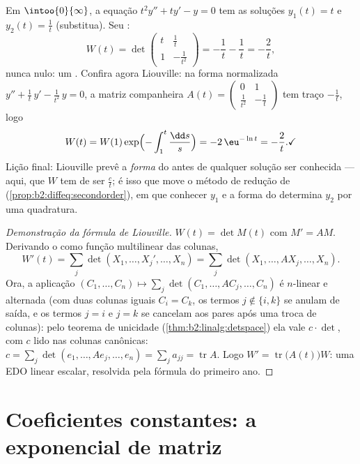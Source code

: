 \begin{example}\label{ex:b2:diffeq:eulerwronskian}
Em $\intoo{0}{\infty}$, a equação $t^2y'' + ty' - y = 0$ tem
as soluções $y_1(t) = t$ e $y_2(t) = \frac1t$ (substitua).
Seu :
\[
W(t) = \det\begin{pmatrix} t & \tfrac1t\\[2pt]
1 & -\tfrac{1}{t^2}\end{pmatrix}
= -\frac1t - \frac1t = -\frac2t ,
\]
nunca nulo: um . Confira agora Liouville: na
forma normalizada $y'' + \frac1t\,y' - \frac{1}{t^2}\,y = 0$, a
matriz companheira $A(t) = \begin{pmatrix} 0 & 1\\ \frac{1}{t^2}
& -\frac1t\end{pmatrix}$ tem traço $-\frac1t$, logo
\[
W(t) = W(1)\exp\Bigl(-\int_1^t\frac{\dd s}{s}\Bigr)
= -2\,\eu^{-\ln t} = -\frac2t . \checkmark
\]
Lição final: Liouville prevê a \emph{forma} do
 antes de qualquer solução ser conhecida --- aqui, que $W$ tem de
ser $\frac{c}{t}$; é isso que move o método de
redução de 
(\cref{prop:b2:diffeq:secondorder}), em que conhecer $y_1$ e
a forma do  determina $y_2$ por uma quadratura.
\end{example}

\begin{proof}[Demonstração da fórmula de Liouville]
$W(t) = \det M(t)$ com $M' = AM$. Derivando o 
como função multilinear das colunas,
\[
W'(t) = \sum_j \det(X_1, \dots, X_j', \dots, X_n)
= \sum_j \det(X_1, \dots, AX_j, \dots, X_n) .
\]
Ora, a aplicação $(C_1, \dots, C_n) \mapsto \sum_j \det(C_1, \dots,
AC_j, \dots, C_n)$ é $n$-linear e alternada (com duas colunas
iguais $C_i = C_k$, os termos $j \notin \{i, k\}$ se anulam de saída,
e os termos $j = i$ e $j = k$ se cancelam aos pares após uma troca de
colunas): pelo teorema de unicidade
(\cref{thm:b2:linalg:detspace}) ela vale $c \cdot \det$, com $c$ lido
nas colunas canônicas: $c = \sum_j \det(e_1, \dots, Ae_j, \dots,
e_n) = \sum_j a_{jj} = \operatorname{tr} A$. Logo $W' =
\operatorname{tr}\bigl(A(t)\bigr)W$: uma EDO linear escalar, resolvida pela
fórmula do primeiro ano.
\end{proof}

\section{Coeficientes constantes: a exponencial de matriz}

